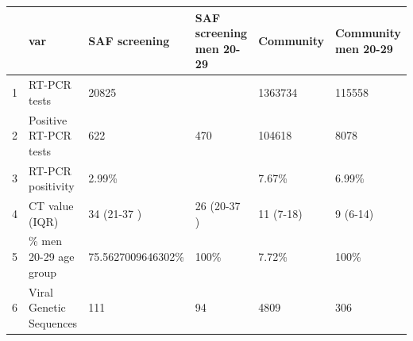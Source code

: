 \begin{table}[ht]
\centering
\begin{tabular}{rlllll}
  \hline
 & var & SAF screening & SAF screening men 20-29 & Community & Community men 20-29 \\ 
  \hline
1 & RT-PCR tests & 20825 &  & 1363734 & 115558 \\ 
  2 & Positive RT-PCR tests & 622 & 470 & 104618 & 8078 \\ 
  3 & RT-PCR positivity & 2.99\% &  & 7.67\% & 6.99\% \\ 
  4 & CT value (IQR) & 34 (21-37 ) & 26 (20-37 ) & 11 (7-18) & 9 (6-14) \\ 
  5 & \% men 20-29 age group & 75.5627009646302\% & 100\% & 7.72\% & 100\% \\ 
  6 & Viral Genetic Sequences & 111 & 94 & 4809 & 306 \\ 
   \hline
\end{tabular}
\end{table}
